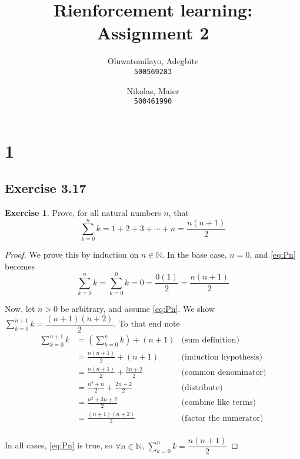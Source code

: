 \documentclass[12pt]{extarticle}
\title{Rienforcement learning: Assignment 2}
\author{
  Oluwatomilayo, Adegbite\\
  \texttt{500569283}
  \and
  Nikolas, Maier\\
  \texttt{500461990}
}
\newcommand{\N}{\mathbb{N}}
\newcommand{\<}{\langle}
\renewcommand{\>}{\rangle}
\theoremstyle{definition}
\newtheorem{exercise}{Exercise}
\newcommand{\Disp}{\displaystyle}
\begin{document}
\maketitle

\section{1}
\subsection{Exercise 3.17}
\begin{exercise} Prove, for all natural numbers $n$, that 
\begin{equation} \sum_{k=0}^n k = 1 + 2 + 3 + \cdots + n = \dfrac{n(n+1)}{2}
\label{eq:Pn}\end{equation}
\end{exercise}

\begin{proof}
We prove this by induction on $n\in\N$.  In the base case, $n=0$, and \eqref{eq:Pn} becomes
$$\sum_{k=0}^n k = \sum_{k=0}^0 k = 0 = \dfrac{0(1)}{2} = \dfrac{n(n+1)}{2}$$

Now, let $n>0$ be arbitrary, and assume \eqref{eq:Pn}.
We show $\displaystyle \sum_{k=0}^{n+1} k = \dfrac{(n+1)(n+2)}{2}$.
To that end note 
\begin{align*}
	\sum_{k=0}^{n+1} k &= \left(\sum_{k=0}^{n} k\right) + (n+1) &\mbox{(sum definition)}\\
	&= \frac{n(n+1)}{2} + (n+1) &\mbox{(induction hypothesis)}
	\\
	&= \frac{n(n+1)}{2} + \frac{2n+2}{2} &\mbox{(common denominator)}
	\\
	&= \frac{n^2 +n}{2} + \frac{2n+2}{2} &\mbox{(distribute)}
	\\
	&= \frac{n^2 +3n + 2}{2} &\mbox{(combine like terms)}
	\\
	&= \frac{(n+1)(n+2)}{2} & \mbox{(factor the numerator)}\\
\end{align*}

In all cases, \eqref{eq:Pn} is true, so $\forall n\in \N$, 
$\Disp \sum_{k=0}^n k = \dfrac{n(n+1)}{2}$
\end{proof}
\end{document}
